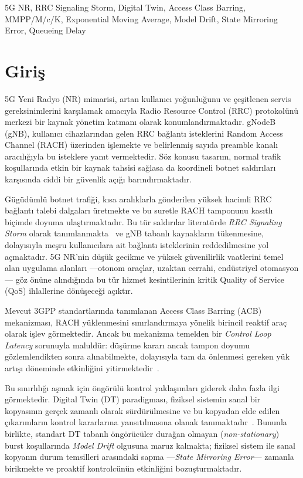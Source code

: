 \documentclass[conference]{IEEEtran}
\begin{document}
\begin{IEEEkeywords}
5G NR, RRC Signaling Storm, Digital Twin, Access Class Barring, MMPP/M/c/K,
Exponential Moving Average, Model Drift, State Mirroring Error, Queueing Delay
\end{IEEEkeywords}

\section{Giriş}

5G Yeni Radyo (NR) mimarisi, artan kullanıcı yoğunluğunu ve çeşitlenen servis
gereksinimlerini karşılamak amacıyla Radio Resource Control (RRC) protokolünü
merkezi bir kaynak yönetim katmanı olarak konumlandırmaktadır. gNodeB (gNB),
kullanıcı cihazlarından gelen RRC bağlantı isteklerini Random Access Channel
(RACH) üzerinden işlemekte ve belirlenmiş sayıda preamble kanalı aracılığıyla
bu isteklere yanıt vermektedir. Söz konusu tasarım, normal trafik koşullarında
etkin bir kaynak tahsisi sağlasa da koordineli botnet saldırıları karşısında
ciddi bir güvenlik açığı barındırmaktadır.

Gügüdümlü botnet trafiği, kısa aralıklarla gönderilen yüksek hacimli RRC
bağlantı talebi dalgaları üretmekte ve bu suretle RACH tamponunu kasıtlı
biçimde doyuma ulaştırmaktadır. Bu tür saldırılar literatürde \emph{RRC
Signaling Storm} olarak tanımlanmakta~\cite{b1} ve gNB tabanlı kaynakların
tükenmesine, dolayısıyla meşru kullanıcılara ait bağlantı isteklerinin
reddedilmesine yol açmaktadır. 5G NR'nin düşük gecikme ve yüksek güvenilirlik
vaatlerini temel alan uygulama alanları ---otonom araçlar, uzaktan cerrahi,
endüstriyel otomasyon--- göz önüne alındığında bu tür hizmet kesintilerinin
kritik Quality of Service (QoS) ihlallerine dönüşeceği açıktır.

Mevcut 3GPP standartlarında tanımlanan Access Class Barring (ACB) mekanizması,
RACH yüklenmesini sınırlandırmaya yönelik birincil reaktif araç olarak işlev
görmektedir. Ancak bu mekanizma temelden bir \emph{Control Loop Latency}
sorunuyla maluldür: düşürme kararı ancak tampon doyumu gözlemlendikten sonra
alınabilmekte, dolayısıyla tam da önlenmesi gereken yük artışı döneminde
etkinliğini yitirmektedir~\cite{b2}.

Bu sınırlılığı aşmak için öngörülü kontrol yaklaşımları giderek daha fazla ilgi
görmektedir. Digital Twin (DT) paradigması, fiziksel sistemin sanal bir
kopyasının gerçek zamanlı olarak sürdürülmesine ve bu kopyadan elde edilen
çıkarımların kontrol kararlarına yansıtılmasına olanak tanımaktadır~\cite{b3}.
Bununla birlikte, standart DT tabanlı öngörücüler durağan olmayan
(\emph{non-stationary}) burst koşullarında \emph{Model Drift} olgusuna maruz
kalmakta; fiziksel sistem ile sanal kopyanın durum temsilleri arasındaki sapma
---\emph{State Mirroring Error}--- zamanla birikmekte ve proaktif kontrolcünün
etkinliğini bozuşturmaktadır.
\end{document}

